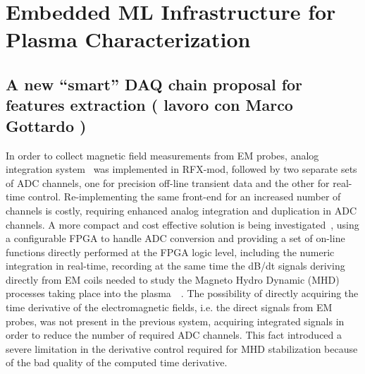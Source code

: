 \chapter{Embedded ML Infrastructure for Plasma Characterization}

\section{A new “smart” DAQ chain proposal for features extraction ( lavoro con Marco Gottardo )}


In order to collect magnetic field measurements from EM probes, analog integration system~\cite{pomaro2005transducers} was implemented in RFX-mod, followed by two separate sets of ADC channels, one for precision off-line transient data and the other for real-time control. Re-implementing the same front-end for an increased number of channels is costly, requiring enhanced analog integration and duplication in ADC channels.  A more compact and cost effective solution is being investigated~\cite{gottardo18}, using a configurable FPGA to handle ADC conversion and providing a set of on-line functions directly performed at the FPGA logic level, including the numeric integration in real-time, recording at the same time the dB/dt signals deriving directly from EM coils needed to study the Magneto Hydro Dynamic (MHD) processes taking place into the plasma~\cite{zuin2009current}~\cite{innocente2014tearing}. The possibility of directly acquiring the time derivative of the electromagnetic fields, i.e. the direct signals from EM probes, was not present in the previous system, acquiring integrated signals in order to reduce the number of required ADC channels. This fact introduced a severe limitation in the derivative control required for MHD stabilization because of the bad quality of the computed time derivative.


